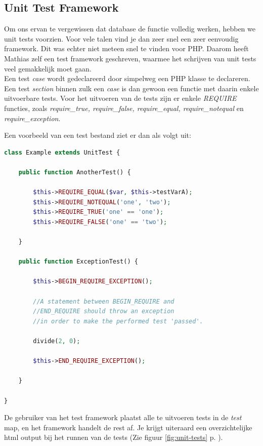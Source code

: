 \documentclass[11pt]{article}
\begin{document}
\subsection{Unit Test Framework}

Om ons ervan te vergewissen dat database de functie volledig werken, hebben we unit tests voorzien. Voor vele talen vind je dan zeer snel een zeer eenvoudig framework. Dit was echter niet meteen snel te vinden voor PHP. Daarom heeft Mathias zelf een test framework geschreven, waarmee het schrijven van unit tests veel gemakkelijk moet gaan.\\

Een test \emph{case} wordt gedeclareerd door simpelweg een PHP klasse te declareren. Een test \emph{section} binnen zulk een \emph{case} is dan gewoon een functie met daarin enkele uitvoerbare tests.
Voor het uitvoeren van de tests zijn er enkele \emph{REQUIRE} functies, zoals \emph{require\_true, require\_false, require\_equal, require\_notequal} en \emph{require\_exception}.

Een voorbeeld van een test bestand ziet er dan als volgt uit:

\begin{framed}
\begin{lstlisting}[language=php]
class Example extends UnitTest {
	
	public function AnotherTest() {
		
		$this->REQUIRE_EQUAL($var, $this->testVarA);
		$this->REQUIRE_NOTEQUAL('one', 'two');
		$this->REQUIRE_TRUE('one' == 'one');
		$this->REQUIRE_FALSE('one' == 'two');
		
	}
	
	public function ExceptionTest() {
		
		$this->BEGIN_REQUIRE_EXCEPTION();

		//A statement between BEGIN_REQUIRE and
		//END_REQUIRE should throw an exception
		//in order to make the performed test 'passed'.
		
		divide(2, 0);
		
		$this->END_REQUIRE_EXCEPTION();
		
	}	
	
}
\end{lstlisting}
\end{framed}


De gebruiker van het test framework plaatst alle te uitvoeren tests in de \emph{test} map, en het framework handelt de rest af. Je krijgt uiteraard een overzichtelijke html output bij het runnen van de tests (Zie figuur \ref{fig:unit-tests} p. \pageref{fig:unit-tests}).
\end{document}
